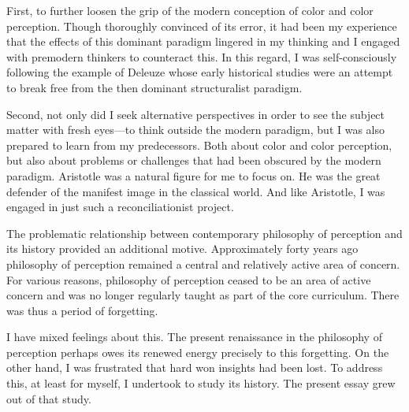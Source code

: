 First, to further loosen the grip of the modern conception of color and color perception. Though thoroughly convinced of its error, it had been my experience that the effects of this dominant paradigm lingered in my thinking and I engaged with premodern thinkers to counteract this. In this regard, I was self-consciously following the example of Deleuze whose early historical studies were an attempt to break free from the then dominant structuralist paradigm.

Second, not only did I seek alternative perspectives in order to see the subject matter with fresh eyes---to think outside the modern paradigm, but I was also prepared to learn from my predecessors. Both about color and color perception, but also about problems or challenges that had been obscured by the modern paradigm. Aristotle was a natural figure for me to focus on. He was the great defender of the manifest image in the classical world. And like Aristotle, I was engaged in just such a reconciliationist project.

The problematic relationship between contemporary philosophy of perception and its history provided an additional motive. Approximately forty years ago philosophy of perception remained a central and relatively active area of concern. For various reasons, philosophy of perception ceased to be an area of active concern and was no longer regularly taught as part of the core curriculum. There was thus a period of forgetting. 

I have mixed feelings about this. The present renaissance in the philosophy of perception perhaps owes its renewed energy precisely to this forgetting. On the other hand, I was frustrated that hard won insights had been lost. To address this, at least for myself, I undertook to study its history. The present essay grew out of that study.

